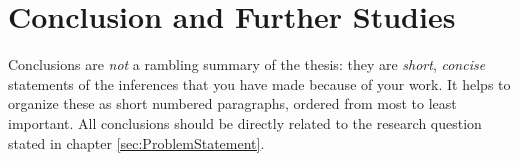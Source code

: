 \chapter{Conclusion and Further Studies}
\label{sec:ConclusionAndFurtherStudies}

Conclusions are \textit{not} a rambling summary of the thesis: they are
\textit{short}, \textit{concise} statements of the inferences that you have made
because of your work. It helps to organize these as short numbered paragraphs,
ordered from most to least important. All conclusions should be directly related
to the research question stated in chapter \ref{sec:ProblemStatement}.